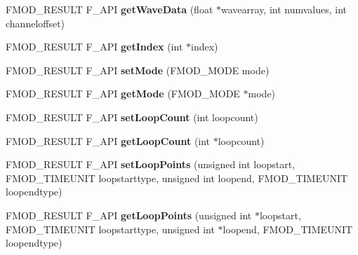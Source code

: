 \begin{DoxyCompactItemize}
\item 
F\+M\+O\+D\+\_\+\+R\+E\+S\+U\+LT F\+\_\+\+A\+PI {\bfseries get\+Wave\+Data} (float $\ast$wavearray, int numvalues, int channeloffset)\hypertarget{class_f_m_o_d_1_1_channel_ad313289938f682ec0a4cf818a9f89966}{}\label{class_f_m_o_d_1_1_channel_ad313289938f682ec0a4cf818a9f89966}

\item 
F\+M\+O\+D\+\_\+\+R\+E\+S\+U\+LT F\+\_\+\+A\+PI {\bfseries get\+Index} (int $\ast$index)\hypertarget{class_f_m_o_d_1_1_channel_ad1d410d1d16d0c153dd0af5de8fda88e}{}\label{class_f_m_o_d_1_1_channel_ad1d410d1d16d0c153dd0af5de8fda88e}

\item 
F\+M\+O\+D\+\_\+\+R\+E\+S\+U\+LT F\+\_\+\+A\+PI {\bfseries set\+Mode} (F\+M\+O\+D\+\_\+\+M\+O\+DE mode)\hypertarget{class_f_m_o_d_1_1_channel_a3fd338310b9d07f26d9934499235ccb5}{}\label{class_f_m_o_d_1_1_channel_a3fd338310b9d07f26d9934499235ccb5}

\item 
F\+M\+O\+D\+\_\+\+R\+E\+S\+U\+LT F\+\_\+\+A\+PI {\bfseries get\+Mode} (F\+M\+O\+D\+\_\+\+M\+O\+DE $\ast$mode)\hypertarget{class_f_m_o_d_1_1_channel_a6965a6f0867195b4666101283319b2c6}{}\label{class_f_m_o_d_1_1_channel_a6965a6f0867195b4666101283319b2c6}

\item 
F\+M\+O\+D\+\_\+\+R\+E\+S\+U\+LT F\+\_\+\+A\+PI {\bfseries set\+Loop\+Count} (int loopcount)\hypertarget{class_f_m_o_d_1_1_channel_a7dc161cf3a929cd48da580634059f6a6}{}\label{class_f_m_o_d_1_1_channel_a7dc161cf3a929cd48da580634059f6a6}

\item 
F\+M\+O\+D\+\_\+\+R\+E\+S\+U\+LT F\+\_\+\+A\+PI {\bfseries get\+Loop\+Count} (int $\ast$loopcount)\hypertarget{class_f_m_o_d_1_1_channel_a23128bf2475ef316e1c38a3606ccbfd0}{}\label{class_f_m_o_d_1_1_channel_a23128bf2475ef316e1c38a3606ccbfd0}

\item 
F\+M\+O\+D\+\_\+\+R\+E\+S\+U\+LT F\+\_\+\+A\+PI {\bfseries set\+Loop\+Points} (unsigned int loopstart, F\+M\+O\+D\+\_\+\+T\+I\+M\+E\+U\+N\+IT loopstarttype, unsigned int loopend, F\+M\+O\+D\+\_\+\+T\+I\+M\+E\+U\+N\+IT loopendtype)\hypertarget{class_f_m_o_d_1_1_channel_abcac3fd6f8fb5a3f1097237a9ff00ee6}{}\label{class_f_m_o_d_1_1_channel_abcac3fd6f8fb5a3f1097237a9ff00ee6}

\item 
F\+M\+O\+D\+\_\+\+R\+E\+S\+U\+LT F\+\_\+\+A\+PI {\bfseries get\+Loop\+Points} (unsigned int $\ast$loopstart, F\+M\+O\+D\+\_\+\+T\+I\+M\+E\+U\+N\+IT loopstarttype, unsigned int $\ast$loopend, F\+M\+O\+D\+\_\+\+T\+I\+M\+E\+U\+N\+IT loopendtype)\hypertarget{class_f_m_o_d_1_1_channel_a32b040f752fc4fba7d46054ddbd6b913}{}\label{class_f_m_o_d_1_1_channel_a32b040f752fc4fba7d46054ddbd6b913}


\end{DoxyCompactItemize}

